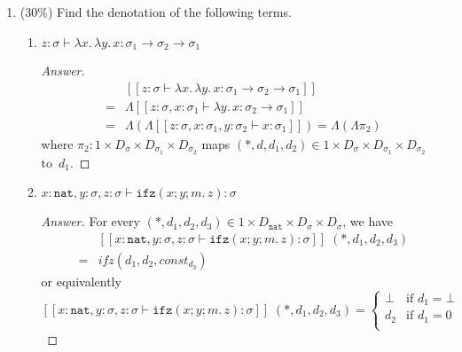 \documentclass{article}
\newcommand{\sem}[1]{[\![#1]\!]}
\begin{document}
\begin{enumerate}
\begin{enumerate}
\begin{proof}[Answer]
\begin{align*}
            \leadsto&(\lambda n.\, \mathtt{ifz}(n; \mathtt{ifz}(\underline{0};
            \underline{1}; m.\, \mathtt{suc}\;m);
            x. x)
          \end{align*}
        \end{proof}
    \end{enumerate}
  \item (30\%) Find the denotation of the following terms.
    \begin{enumerate}
      \item $z : \sigma \vdash \lambda x.\,\lambda y.\, x : \sigma_1 \to
        \sigma_2 \to \sigma_1$
        \begin{proof}[Answer]
          \begin{align*}
            &\sem{z : \sigma \vdash \lambda x.\,\lambda y.\, x : \sigma_1 \to
              \sigma_2 \to \sigma_1} \\
            ={} & \Lambda \sem{z : \sigma, x : \sigma_1
              \vdash \lambda y.\, x : \sigma_2\to\sigma_1} \\
            ={} & \Lambda (\Lambda
            \sem{z : \sigma, x : \sigma_1, y : \sigma_2 \vdash x : \sigma_1}) =
            \Lambda (\Lambda \pi_2)
        \end{align*}
        where $\pi_2 : 1 \times D_\sigma \times D_{\sigma_1} \times
        D_{\sigma_2}$ maps $(*, d, d_1, d_2) \in 1 \times D_\sigma \times
        D_{\sigma_1} \times D_{\sigma_2}$ to~$d_1$. 
      \end{proof}
      \item $x : \mathtt{nat}, y : \sigma, z : \sigma \vdash
        \mathtt{ifz}(x; y; m.\, z) : \sigma$
        \begin{proof}[Answer]
          For every $(*, d_1, d_2, d_3) \in 1 \times D_{\mathtt{nat}} \times D_\sigma
          \times D_\sigma$, we have
          \begin{align*}
            &\sem{x : \mathtt{nat}, y : \sigma, z : \sigma \vdash \mathtt{ifz}(x; y;
            m.\, z) : \sigma}\;(*, d_1, d_2, d_3) \\
          ={} & \mathit{ifz}(d_1, d_2, \mathit{const}_{d_3})
          \end{align*}
          or equivalently 
          \[
            \sem{x : \mathtt{nat}, y : \sigma, z : \sigma \vdash \mathtt{ifz}(x; y;
            m.\, z) : \sigma}\;(*, d_1, d_2, d_3) =
          \begin{cases}
            \bot & \text{if } d_1 = \bot \\
            d_2 & \text{if } d_1 = 0 \\

\end{cases}\]
\end{proof}
\end{enumerate}
\end{enumerate}
\end{document}
